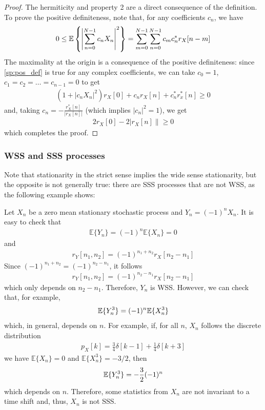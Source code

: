 \begin{proof}
The hermiticity and property 2 are a direct consequence of the definition. To prove the positive definiteness, note that, for any coefficients $c_n$, we have
\begin{align}
0 \le \mathbb{E}\left\{\left|\sum_{n=0}^{N-1} c_n X_n\right|^2 \right\}  
  =   \sum_{m=0}^{N-1}\sum_{n=0}^{N-1} c_m c_n^* r_X[n-m] 
\end{align}
The maximality at the origin is a consequence of the positive definiteness: since \eqref{sp:pos_def} is true for any complex coefficients, we can take $c_0=1$, $c_1=c_2=\ldots =c_{n-1}=0$ to get
\begin{align}
(1 + \left|c_n X_n\right|^2) r_X[0] + c_n r_X[n] + c_n^* r_x^*[n] \ge 0
\end{align}
and, taking $c_n = -\frac{r_X^*[n]}{\left|r_X[n]\right|}$ (which implies $\left|c_n\right|^2=1$), we get
\begin{align}
2 r_X[0] - 2 \left|r_X[n]\right\| \ge 0
\end{align}
which completes the proof.
\end{proof}

\subsubsection{WSS and SSS processes}

Note that stationarity in the strict sense implies the wide sense stationarity, but the opposite is not generally true: there are SSS processes that are not WSS, as the following example shows:

\begin{example}
Let $X_n$ be a zero mean stationary stochastic process and $Y_n=(-1)^n X_n$. It is easy to check that
\begin{eqnarray}
\mathbb{E}\{Y_n\} = (-1)^n \mathbb{E}\{X_n\} = 0
\end{eqnarray}
and
\begin{eqnarray}
r_Y[n_1,n_2] = (-1)^{n_1+n_2}r_X[n_2-n_1]
\end{eqnarray}
Since $(-1)^{n_1+n_2}=(-1)^{n_2-n_1}$, it follows
\begin{eqnarray}
r_Y[n_1,n_2] = (-1)^{n_2-n_1}r_X[n_2-n_1]
\end{eqnarray}
which only depends on $n_2-n_1$. Therefore, $Y_n$ is WSS. However, we can check that, for example,
\begin{eqnarray}
\mathbb{E}\{Y^3_n\} = (-1)^n \mathbb{E}\{X^3_n\}
\end{eqnarray}
which, in general, depends on $n$. For example, if, for all $n$, $X_n$ follows the discrete distribution
\begin{eqnarray}
p_X[k] = \frac{3}{4}\delta[k-1]+\frac{1}{4}\delta[k+3]
\end{eqnarray}
we have $\mathbb{E}\{X_n\}=0$ and $\mathbb{E}\{X_n^3\}= -3/2$, then
\begin{eqnarray}
\mathbb{E}\{Y^3_n\} = -\frac{3}{2}(-1)^n
\end{eqnarray}
which depends on $n$. Therefore, some statistics from $X_n$ are not invariant to a time shift and, thus, $X_n$ is not SSS.
\end{example}

